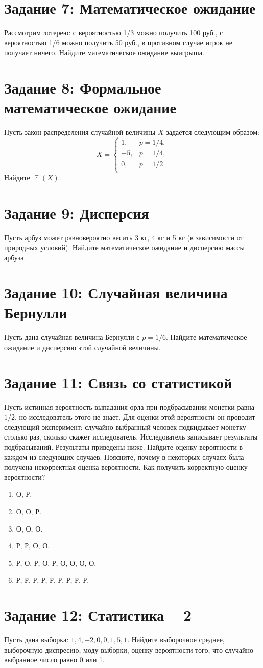 \documentclass[10pt, a4paper]{extarticle}
\DeclareMathOperator{\E}{\mathbb{E}}
\begin{document}
\section*{Задание 7: Математическое ожидание}
Рассмотрим лотерею: с вероятностью 1/3 можно получить 100 руб., с вероятностью 1/6 можно получить 50 руб., в противном случае игрок не получает ничего. Найдите математическое ожидание выигрыша. 

\section*{Задание 8: Формальное математическое ожидание}
Пусть закон распределения случайной величины $X$ задаётся следующим образом:
\[
X = \begin{cases}
1, &p = 1/4, \\
-5, &p = 1/4, \\
0, &p = 1/2 \\
\end{cases}
\]
Найдите $\E(X)$.

\section*{Задание 9: Дисперсия}
Пусть арбуз может равновероятно весить 3 кг, 4 кг и 5 кг (в зависимости от природных условий). Найдите математическое ожидание и дисперсию массы арбуза. 

\section*{Задание 10: Случайная величина Бернулли}
Пусть дана случайная величина Бернулли с $p = 1/6$. Найдите математическое ожидание и дисперсию этой случайной величины.

\section*{Задание 11: Связь со статистикой}
Пусть истинная вероятность выпадания орла при подбрасывании монетки равна $1/2$, но исследователь этого не знает. Для оценки этой вероятности он проводит следующий эксперимент: случайно выбранный человек подкидывает монетку столько раз, сколько скажет исследователь. Исследователь записывает результаты подбрасываний. Результаты приведены ниже. Найдите оценку вероятности в каждом из следующих случаев. Поясните, почему в некоторых случаях была получена некорректная оценка вероятности. Как получить корректную оценку вероятности? 
\begin{enumerate}[label=\alph*)]
	\item О, Р.
	\item О, О, Р.
	\item О, О, О.
	\item Р, Р, О, О.
	\item Р, О, Р, О, Р, О, О, О, О. 
	\item Р, Р, Р, Р, Р, Р, Р, Р, Р. 
\end{enumerate}

\section*{Задание 12: Статистика – 2}
Пусть дана выборка: $1, 4, -2, 0, 0, 1, 5, 1$. Найдите выборочное среднее, выборочную диспресию, моду выборки, оценку вероятности того, что случайно выбранное число равно 0 или 1. 
\end{document}

